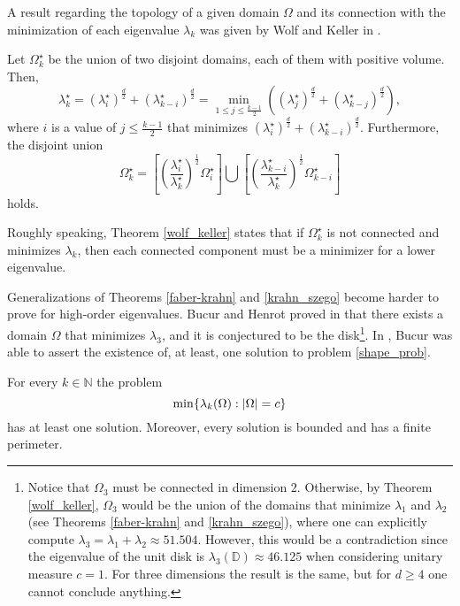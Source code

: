 A result regarding the topology of a given domain \(\Omega\) and its connection with the minimization of each eigenvalue \(\lambda_k\) was given by Wolf and Keller in \cite{wolf1994range}.
\begin{theorem}\label{wolf_keller}
    Let \(\Omega_k^\star\) be the union of two disjoint domains, each of them with positive volume. Then,
    \[
        \lambda_k^\star = (\lambda_i^\star)^\frac{d}{2} + (\lambda_{k-i}^\star)^\frac{d}{2} = \min_{1 \leq j \leq \frac{k-1}{2}}((\lambda_j^\star)^\frac{d}{2} + (\lambda_{k-j}^\star)^\frac{d}{2}),
    \]
    where \(i\) is a value of \(j \leq \frac{k-1}{2}\) that minimizes \(\left(\lambda_i^\star\right)^\frac{d}{2} + \left(\lambda_{k-i}^\star\right)^\frac{d}{2}\). Furthermore, the disjoint union
    \[
        \Omega_k^\star = \left[\left(\frac{\lambda_i^\star}{\lambda_k^\star}\right)^\frac{1}{2} \Omega_i^\star\right] \bigcup \left[\left(\frac{\lambda_{k-i}^\star}{\lambda_k^\star}\right)^\frac{1}{2} \Omega_{k-i}^\star \right]
    \]
    holds.
\end{theorem}
Roughly speaking, Theorem \ref{wolf_keller} states that if \(\Omega_k^\star\) is not connected and minimizes \(\lambda_k\), then each connected component must be a minimizer for a lower eigenvalue.

Generalizations of Theorems \ref{faber-krahn} and \ref{krahn_szego} become harder to prove for high-order eigenvalues. Bucur and Henrot proved in \cite{henrot2000minimization} that there exists a domain \(\Omega\) that minimizes \(\lambda_3\), and it is conjectured to be the disk\footnote{Notice that \(\Omega_3\) must be connected in dimension \(2\). Otherwise, by Theorem \ref{wolf_keller}, \(\Omega_3\) would be the union of the domains that minimize \(\lambda_1\) and \(\lambda_2\) (see Theorems \ref{faber-krahn} and \ref{krahn_szego}), where one can explicitly compute \(\lambda_3 = \lambda_1 + \lambda_2 \approx 51.504\). However, this would be a contradiction since the eigenvalue of the unit disk is \(\lambda_3(\mathbb{D}) \approx 46.125\) when considering unitary measure \(c=1\). For three dimensions the result is the same, but for \(d \geq 4\) one cannot conclude anything.}.
In \cite{bucur2012minimization}, Bucur was able to assert the existence of, at least, one solution to problem \eqref{shape_prob}.
\begin{theorem}[Bucur]
    For every \(k \in \mathbb{N}\) the problem
    \[
    \min\{\lambda_k(\Omega): \abs{\Omega} = c\}
    \]
    has at least one solution. Moreover, every solution is bounded and has a finite perimeter.
\end{theorem}

